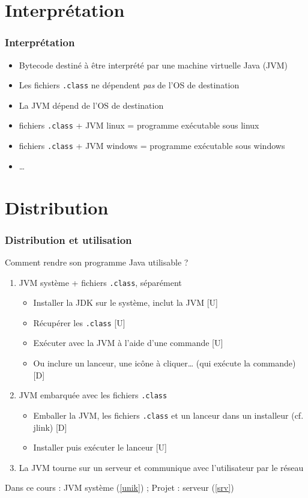 \documentclass[english, french]{beamer}
\begin{document}
\section{Interprétation}
\begin{frame}
	\frametitle{Interprétation}
	\begin{itemize}
		\item Bytecode destiné à être interprété par une machine virtuelle Java (JVM)
		\item Les fichiers \texttt{.class} ne dépendent \emph{pas} de l’OS de destination
		\item La JVM dépend de l’OS de destination
		\item[⇒] fichiers \texttt{.class} + JVM linux = programme exécutable sous linux
		\item[⇒] fichiers \texttt{.class} + JVM windows = programme exécutable sous windows
		\item[⇒] …
	\end{itemize}
\end{frame}

\section{Distribution}
\begin{frame}
	\frametitle{Distribution et utilisation}
	Comment rendre son programme Java utilisable ?
	\begin{enumerate}
		\item \label{unik} JVM système + fichiers \texttt{.class}, séparément
		\begin{itemize}
			\item Installer la JDK sur le système, inclut la JVM [U]
			\item Récupérer les \texttt{.class} [U]
			\item Exécuter avec la JVM à l’aide d’une commande [U]
			\item Ou inclure un lanceur, une icône à cliquer… (qui exécute la commande) [D]
		\end{itemize}
		\item JVM embarquée avec les fichiers \texttt{.class}
		\begin{itemize}
			\item Emballer la JVM, les fichiers \texttt{.class} et un lanceur dans un installeur (cf. jlink) [D]
			\item Installer puis exécuter le lanceur [U]
		\end{itemize}
		\item \label{srv} La JVM tourne sur un serveur et communique avec l’utilisateur par le réseau
	\end{enumerate}
	Dans ce cours : JVM système (\ref{unik}) ; Projet : serveur (\ref{srv})
\end{frame}
\end{document}
